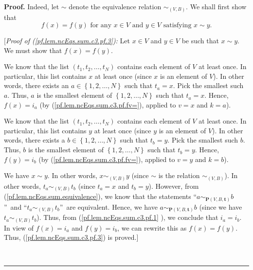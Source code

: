 \documentclass[numbers=enddot,12pt,final,onecolumn,notitlepage]{scrartcl}%
\theoremstyle{definition}
\newenvironment{proof}[1][Proof]{\noindent\textbf{#1.} }{\ \rule{0.5em}{0.5em}}
\newenvironment{verlong}{}{}
\begin{document}
\begin{proof}
\begin{verlong}
Indeed, let $\sim$ denote the equivalence relation $\sim_{\left(  V,B\right)
}$. We shall first show that%
\begin{equation}
f\left(  x\right)  =f\left(  y\right)  \text{ for any }x\in V\text{ and }y\in
V\text{ satisfying }x\sim y. \label{pf.lem.ncEqs.sum.c3.pf.3}%
\end{equation}


[\textit{Proof of (\ref{pf.lem.ncEqs.sum.c3.pf.3}):} Let $x\in V$ and $y\in V$
be such that $x\sim y$. We must show that $f\left(  x\right)  =f\left(
y\right)  $.

We know that the list $\left(  t_{1},t_{2},\ldots,t_{N}\right)  $ contains
each element of $V$ at least once. In particular, this list contains $x$ at
least once (since $x$ is an element of $V$). In other words, there exists an
$a\in\left\{  1,2,\ldots,N\right\}  $ such that $t_{a}=x$. Pick the smallest
such $a$. Thus, $a$ is the smallest element of $\left\{  1,2,\ldots,N\right\}
$ such that $t_{a}=x$. Hence, $f\left(  x\right)  =i_{a}$ (by
(\ref{pf.lem.ncEqs.sum.c3.pf.fv=}), applied to $v=x$ and $k=a$).

We know that the list $\left(  t_{1},t_{2},\ldots,t_{N}\right)  $ contains
each element of $V$ at least once. In particular, this list contains $y$ at
least once (since $y$ is an element of $V$). In other words, there exists a
$b\in\left\{  1,2,\ldots,N\right\}  $ such that $t_{b}=y$. Pick the smallest
such $b$. Thus, $b$ is the smallest element of $\left\{  1,2,\ldots,N\right\}
$ such that $t_{b}=y$. Hence, $f\left(  y\right)  =i_{b}$ (by
(\ref{pf.lem.ncEqs.sum.c3.pf.fv=}), applied to $v=y$ and $k=b$).

We have $x\sim y$. In other words, $x\sim_{\left(  V,B\right)  }y$ (since
$\sim$ is the relation $\sim_{\left(  V,B\right)  }$). In other words,
$t_{a}\sim_{\left(  V,B\right)  }t_{b}$ (since $t_{a}=x$ and $t_{b}=y$).
However, from (\ref{pf.lem.ncEqs.sum.equivalence}), we know that the
statements \textquotedblleft$a\sim_{\mathbf{P}\left(  V,B,\mathbf{t}\right)
}b$\textquotedblright\ and \textquotedblleft$t_{a}\sim_{\left(  V,B\right)
}t_{b}$\textquotedblright\ are equivalent. Hence, we have $a\sim
_{\mathbf{P}\left(  V,B,\mathbf{t}\right)  }b$ (since we have $t_{a}%
\sim_{\left(  V,B\right)  }t_{b}$). Thus, from (\ref{pf.lem.ncEqs.sum.c3.pf.1}%
), we conclude that $i_{a}=i_{b}$. In view of $f\left(  x\right)  =i_{a}$ and
$f\left(  y\right)  =i_{b}$, we can rewrite this as $f\left(  x\right)
=f\left(  y\right)  $. Thus, (\ref{pf.lem.ncEqs.sum.c3.pf.3}) is proved.]


\end{verlong}
\end{proof}
\end{document}
